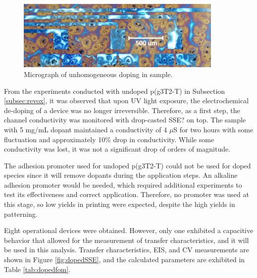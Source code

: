 \begin{figure}[ht]
    \centering
    \includegraphics[width=10cm]{Images/pdf/unhom_doping.pdf} 
    \caption[Unhomogeneous doping issues]{Micrograph of unhomogeneous doping in sample.}
    \label{fig:unhom}
\end{figure}

From the experiments conducted with undoped p(g3T2-T) in Subsection \ref{subsec:revox}, it was observed that upon UV light exposure, the electrochemical de-doping of a device was no longer irreversible. Therefore, as a first step, the channel conductivity was monitored with drop-casted SSE? on top. The sample with 5 mg/mL dopant maintained a conductivity of 4 $\mu$S for two hours with some fluctuation and approximately 10\% drop in conductivity. While some conductivity was lost, it was not a significant drop of orders of magnitude. 

The adhesion promoter used for undoped p(g3T2-T) could not be used for doped species since it will remove dopants during the application steps. An alkaline adhesion promoter would be needed, which required additional experiments to test its effectiveness and correct application. Therefore, no promoter was used at this stage, so low yields in printing were expected, despite the high yields in patterning.

Eight operational devices were obtained. However, only one exhibited a capacitive behavior that allowed for the measurement of transfer characteristics, and it will be used in this analysis. %
Transfer characteristics, EIS, and CV measurements are shown in Figure \ref{fig:dopedSSE}, and the calculated parameters are exhibited in Table \ref{tab:dopedfom}.

